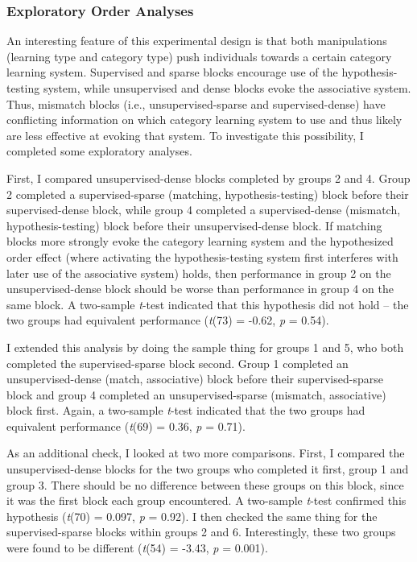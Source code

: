 \documentclass[../dissertation.tex]{subfiles}
\begin{document}
\subsubsection{Exploratory Order Analyses}
An interesting feature of this experimental design is that both manipulations (learning type and category type) push individuals towards a certain category learning system. Supervised and sparse blocks encourage use of the hypothesis-testing system, while unsupervised and dense blocks evoke the associative system. Thus, mismatch blocks (i.e., unsupervised-sparse and supervised-dense) have conflicting information on which category learning system to use and thus likely are less effective at evoking that system. To investigate this possibility, I completed some exploratory analyses.\par
	First, I compared unsupervised-dense blocks completed by groups 2 and 4. Group 2 completed a supervised-sparse (matching, hypothesis-testing) block before their supervised-dense block, while group 4 completed a supervised-dense (mismatch, hypothesis-testing) block before their unsupervised-dense block. If matching blocks more strongly evoke the category learning system and the hypothesized order effect (where activating the hypothesis-testing system first interferes with later use of the associative system) holds, then performance in group 2 on the unsupervised-dense block should be worse than performance in group 4 on the same block. A two-sample \textit{t}-test indicated that this hypothesis did not hold -- the two groups had equivalent performance (\textit{t}(73) = -0.62, \textit{p} = 0.54).\par
	I extended this analysis by doing the sample thing for groups 1 and 5, who both completed the supervised-sparse block second. Group 1 completed an unsupervised-dense (match, associative) block before their supervised-sparse block and group 4 completed an unsupervised-sparse (mismatch, associative) block first. Again, a two-sample \textit{t}-test indicated that the two groups had equivalent performance (\textit{t}(69) = 0.36, \textit{p} = 0.71). \par
	As an additional check, I looked at two more comparisons. First, I compared the unsupervised-dense blocks for the two groups who completed it first, group 1 and group 3. There should be no difference between these groups on this block, since it was the first block each group encountered.  A two-sample \textit{t}-test confirmed this hypothesis (\textit{t}(70) = 0.097, \textit{p} = 0.92). I then checked the same thing for the supervised-sparse blocks within groups 2 and 6. Interestingly, these two groups were found to be different (\textit{t}(54) = -3.43, \textit{p} = 0.001).
\end{document}
